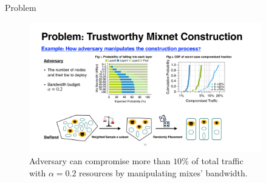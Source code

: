 \documentclass[final]{beamer}
\newlength{\sepwidth}
\newlength{\leftcolwidth}
\newlength{\maincolwidth}
\newlength{\rightcolwidth}
\newcommand{\separatorcolumn}{\begin{column}{\sepwidth}\end{column}}
\begin{document}
\begin{frame}[t]
\begin{columns}[t]
\begin{column}{\leftcolwidth}
\begin{block}{Problem}
  \vspace{1.5cm}
  \begin{figure}
    \includegraphics[width=\rightcolwidth]{images/problem_eg.pdf}
    \caption{Adversary can compromise more than $10\%$ of total traffic with $\alpha=0.2$ resources by manipulating mixes' bandwidth.}
  \end{figure}
\end{block}
\end{column}


\separatorcolumn

\begin{column}{\maincolwidth}


\end{column}
\end{columns}
\end{frame}
\end{document}
